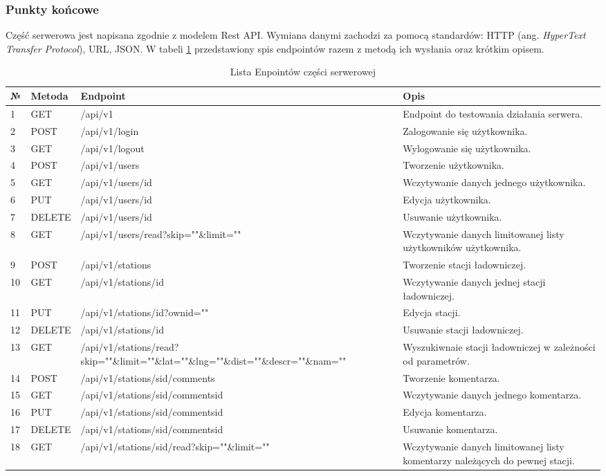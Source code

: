 \subsubsection{Punkty końcowe}
Część serwerowa jest napisana zgodnie z modelem Rest API. Wymiana danymi zachodzi za pomocą standardów: HTTP (ang. \textit{HyperText Transfer Protocol}), URL, JSON.
W tabeli \ref{tab:endpoints} przedstawiony spis endpointów razem z metodą ich wysłania oraz krótkim opisem.
\begin{table}[htb] \small
    \caption{Lista Enpointów części serwerowej}
    \label{tab:endpoints}
    \begin{tabular}{| m{0.5cm} | m{2cm} | m{6cm} | m{6cm} |}
    \hline
    № & Metoda & Endpoint & Opis \\
    \hline
    1 & GET & /api/v1 & Endpoint do testowania działania serwera. \\
    \hline
    2 & POST & /api/v1/login & Zalogowanie się użytkownika. \\
    \hline
    3 & GET & /api/v1/logout & Wylogowanie się użytkownika. \\
    \hline
    4 & POST & /api/v1/users & Tworzenie użytkownika. \\
    \hline
    5 & GET & /api/v1/users/{id} & Wczytywanie danych jednego użytkownika. \\
    \hline
    6 & PUT & /api/v1/users/{id} & Edycja użytkownika. \\
    \hline
    7 & DELETE & /api/v1/users/{id} & Usuwanie użytkownika. \\
    \hline
    8 & GET & /api/v1/users/read?skip=""\&limit="" & Wczytywanie danych limitowanej listy użytkowników użytkownika. \\
    \hline
    9 & POST & /api/v1/stations & Tworzenie stacji ładowniczej. \\
    \hline
    10 & GET & /api/v1/stations/{id} & Wczytywanie danych jednej stacji ładowniczej. \\
    \hline
    11 & PUT & /api/v1/stations/{id}?ownid="" & Edycja stacji. \\
    \hline
    12 & DELETE & /api/v1/stations/{id} & Usuwanie stacji ładowniczej. \\
    \hline
    13 & GET & /api/v1/stations/read?skip=""\&limit=""\&lat=""\&lng=""\&dist=""\&descr=""\&nam="" & Wyszukiwnaie stacji ładowniczej w zależności od parametrów. \\
    \hline
    14 & POST & /api/v1/stations/{sid}/comments & Tworzenie komentarza. \\
    \hline
    15 & GET & /api/v1/stations/{sid}/comments{id} & Wczytywanie danych jednego komentarza. \\
    \hline
    16 & PUT & /api/v1/stations/{sid}/comments{id} & Edycja komentarza. \\
    \hline
    17 & DELETE & /api/v1/stations/{sid}/comments{id} & Usuwanie komentarza. \\
    \hline
    18 & GET & /api/v1/stations/{sid}/read?skip=""\&limit="" & Wczytywanie danych limitowanej listy komentarzy należących do pewnej stacji. \\
    \hline
    \end{tabular}
\end{table}

